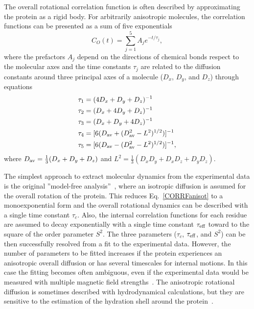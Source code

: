 \documentclass[journal=jpcbfk,manuscript=article]{achemso}
\begin{document}
The overall rotational correlation function is often described
by approximating the protein as a rigid body.
For arbitrarily anisotropic molecules, the correlation functions
can  be presented as a sum of five exponentials~\cite{woessner62,korzhnev01}
\begin{equation}\label{CORRFanisot}
  C_O(t)=\sum_{j=1}^5 A_j e^{-t/\tau_j},
\end{equation}
where the prefactors $A_j$ depend on the directions of chemical bonds 
respect to the molecular axes \cite{woessner62,luginbuhl97} and
the time constants $\tau_j$ are related 
to the diffusion constants around
three principal axes of a molecule
($D_{x}$, $D_{y}$, and $D_{z}$) through equations~\cite{woessner62,korzhnev01}
\begin{equation}\label{tauDIFFeq}
  \begin{split}
  \tau_1&=(4D_{x}+D_{y}+D_{z})^{-1} \\
  \tau_2&=(D_{x}+4D_{y}+D_{z})^{-1} \\
  \tau_3&=(D_{x}+D_{y}+4D_{z})^{-1} \\
  \tau_4&=[6(D_{\rm av}+(D_{\rm av}^2-L^2)^{1/2})]^{-1} \\
  \tau_5&=[6(D_{\rm av}-(D_{\rm av}^2-L^2)^{1/2})]^{-1}, \\
  \end{split}
\end{equation}
where $D_{\rm av}=\frac{1}{3}(D_{x}+D_{y}+D_{z})$ and 
$L^2=\frac{1}{3}(D_{x}D_{y}+D_{x}D_{z}+D_{y}D_{z})$.

The simplest approach to extract molecular dynamics from the experimental
data is the original ''model-free analysis''~\cite{Lipari82},
where an isotropic diffusion is assumed for the overall rotation of the protein.
This reduces Eq.~\ref{CORRFanisot} to a monoexponential form and the overall rotational
dynamics can be described with a single time constant $\tau_c$.
Also, the internal correlation functions for each residue are assumed
to decay exponentially with a single time constant $\tau_{\rm eff}$
toward to the square of the order parameter $S^2$. The three parameters
($\tau_c$, $\tau_{\rm eff}$, and $S^2$) can be then successfully resolved from a
fit to the experimental data.
However, the number of parameters to be fitted increases if the protein
experiences an anisotropic overall diffusion or has several timescales for internal motions.
In this case the fitting becomes often ambiguous, even if the experimental data
would be measured with multiple magnetic field strengths~\cite{dosset00,luginbuhl97,jarymowycz06}.
The anisotropic rotational diffusion is sometimes described with hydrodynamical
calculations, but they are sensitive to the estimation of the
hydration shell around the protein~\cite{torre00}.
\end{document}
